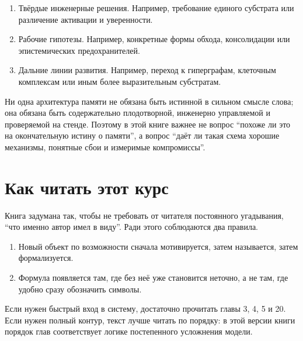 \begin{enumerate}
\item Твёрдые инженерные решения. Например, требование единого субстрата или различение активации и уверенности.
\item Рабочие гипотезы. Например, конкретные формы обхода, консолидации или эпистемических предохранителей.
\item Дальние линии развития. Например, переход к гиперграфам, клеточным комплексам или иным более выразительным субстратам.
\end{enumerate}

\begin{intuition}
Ни одна архитектура памяти не обязана быть истинной в сильном смысле слова;
она обязана быть содержательно плодотворной, инженерно управляемой и
проверяемой на стенде. Поэтому в этой книге важнее не вопрос ``похоже ли это
на окончательную истину о памяти'', а вопрос ``даёт ли такая схема хорошие
механизмы, понятные сбои и измеримые компромиссы''.
\end{intuition}

\section{Как читать этот курс}

Книга задумана так, чтобы не требовать от читателя постоянного угадывания,
``что именно автор имел в виду''. Ради этого соблюдаются два правила.

\begin{enumerate}
\item Новый объект по возможности сначала мотивируется, затем называется, затем формализуется.
\item Формула появляется там, где без неё уже становится неточно, а не там, где удобно сразу обозначить символы.
\end{enumerate}

Если нужен быстрый вход в систему, достаточно прочитать главы 3, 4, 5 и 20.
Если нужен полный контур, текст лучше читать по порядку: в этой версии книги
порядок глав соответствует логике постепенного усложнения модели.
